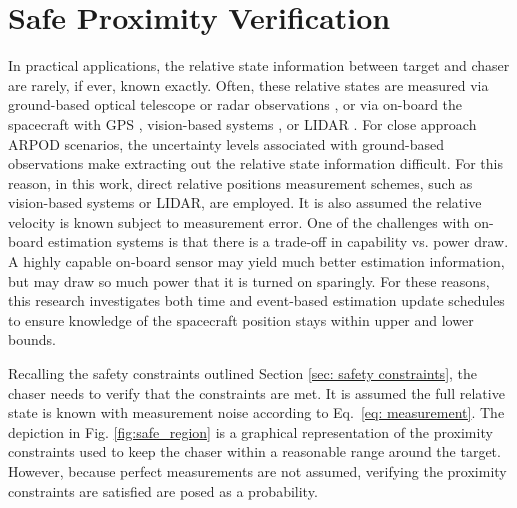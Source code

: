 \documentclass[twocolumn,letterpaper]{IEEEAerospaceCLS}  %
\theoremstyle{definition}
\begin{document}


\section{Safe Proximity Verification} \label{sec: estimation}

In practical applications, the relative state information between target and chaser are rarely, if ever, known exactly. Often, these relative states are measured via ground-based optical telescope or radar observations \cite{poore2016}, or via on-board the spacecraft with GPS \cite{abraham2018gps,winkler2017gps}, vision-based systems \cite{tweddle2015relative}, or LIDAR \cite{christian2013survey}. For close approach ARPOD scenarios, the uncertainty levels associated with ground-based observations make extracting out the relative state information difficult. For this reason, in this work, direct relative positions measurement schemes, such as vision-based systems or LIDAR, are employed. It is also assumed the relative velocity is known subject to measurement error. 
%
%
One of the challenges with on-board estimation systems is that there is a trade-off in capability vs. power draw. A highly capable on-board sensor may yield much better estimation information, but may draw so much power that it is turned on sparingly. For these reasons, this research investigates both time and event-based estimation update schedules to ensure knowledge of the spacecraft position stays within upper and lower bounds.

Recalling the safety constraints outlined Section \ref{sec: safety constraints}, the chaser needs to verify that the constraints are met.
It is assumed the full relative state is known with measurement noise according to Eq.~\eqref{eq: measurement}. 
The depiction in Fig. \ref{fig:safe_region} is a graphical representation of the proximity constraints used to keep the chaser within a reasonable range around the target. 
However, because perfect measurements are not assumed, verifying the proximity constraints are satisfied are posed as a probability. 
\end{document}
